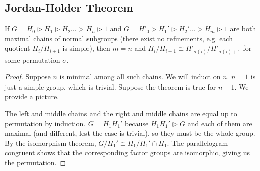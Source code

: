\subsection{Jordan-Holder Theorem}
\begin{theorem}
    If $G = H_0 \triangleright H_1 \triangleright H_2 \dots \triangleright H_n \triangleright 1$
    and $G = H'_0 \triangleright H_1' \triangleright H_2' \dots \triangleright H_m \triangleright 1$
    are both maximal chains of normal subgroups (there exist no refinements, e.g. each quotient $H_i/H_{i + 1}$ is simple),
    then $m = n$ and $H_i/H_{i + 1} \cong H'_{\sigma(i)}/H'_{\sigma(i) + 1}$ for some permutation $\sigma$.
    \begin{proof}
        Suppose $n$ is minimal among all such chains. We will induct on $n$. $n = 1$ is just a simple group, which is trivial.
        Suppose the theorem is true for $n - 1$. We provide a picture.

        The left and middle chains and the right and middle chains are equal up to permutation by induction.
        $G = H_1 H_1'$ because $H_1 H_1' \triangleright G$ and each of them are maximal (and different, lest the case is trivial),
        so they must be the whole group. By the isomorphism theorem, $G/H_1' \cong H_1/H_1'\cap H_1$. The parallelogram congruent shows that the corresponding factor groups are isomorphic,
        giving us the permutation.
    \end{proof}
\end{theorem}